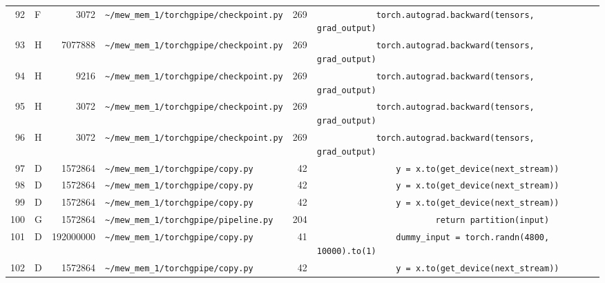\documentclass{article}
\begin{document}
\begin{longtable}{r l r p{6.5cm} r p{7.0cm}}
92 & F & 3072 & \lstinline|~/mew_mem_1/torchgpipe/checkpoint.py| & 269 & \lstinline|            torch.autograd.backward(tensors, grad_output)| \\
93 & H & 7077888 & \lstinline|~/mew_mem_1/torchgpipe/checkpoint.py| & 269 & \lstinline|            torch.autograd.backward(tensors, grad_output)| \\
94 & H & 9216 & \lstinline|~/mew_mem_1/torchgpipe/checkpoint.py| & 269 & \lstinline|            torch.autograd.backward(tensors, grad_output)| \\
95 & H & 3072 & \lstinline|~/mew_mem_1/torchgpipe/checkpoint.py| & 269 & \lstinline|            torch.autograd.backward(tensors, grad_output)| \\
96 & H & 3072 & \lstinline|~/mew_mem_1/torchgpipe/checkpoint.py| & 269 & \lstinline|            torch.autograd.backward(tensors, grad_output)| \\
97 & D & 1572864 & \lstinline|~/mew_mem_1/torchgpipe/copy.py| & 42 & \lstinline|                y = x.to(get_device(next_stream))| \\
98 & D & 1572864 & \lstinline|~/mew_mem_1/torchgpipe/copy.py| & 42 & \lstinline|                y = x.to(get_device(next_stream))| \\
99 & D & 1572864 & \lstinline|~/mew_mem_1/torchgpipe/copy.py| & 42 & \lstinline|                y = x.to(get_device(next_stream))| \\
100 & G & 1572864 & \lstinline|~/mew_mem_1/torchgpipe/pipeline.py| & 204 & \lstinline|                        return partition(input)| \\
101 & D & 192000000 & \lstinline|~/mew_mem_1/torchgpipe/copy.py| & 41 & \lstinline|                dummy_input = torch.randn(4800, 10000).to(1)| \\
102 & D & 1572864 & \lstinline|~/mew_mem_1/torchgpipe/copy.py| & 42 & \lstinline|                y = x.to(get_device(next_stream))| \\
\end{longtable}
\end{document}
